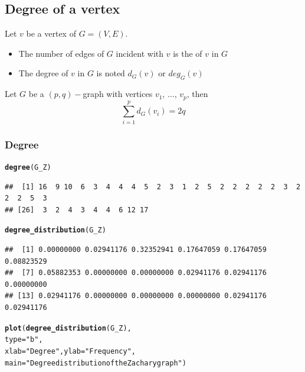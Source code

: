 \documentclass[aspectratio=169]{beamer}\usepackage[]{graphicx}\usepackage[]{xcolor}
\makeatletter
\newcommand{\hlsng}[1]{\textcolor[rgb]{0.192,0.494,0.8}{#1}}%
\newcommand{\hldef}[1]{\textcolor[rgb]{0.345,0.345,0.345}{#1}}%
\newcommand{\hlkwc}[1]{\textcolor[rgb]{0.333,0.667,0.333}{#1}}%
\newcommand{\hlkwd}[1]{\textcolor[rgb]{0.737,0.353,0.396}{\textbf{#1}}}%
\newenvironment{kframe}{%
 \def\at@end@of@kframe{}%
 \ifinner\ifhmode%
  \def\at@end@of@kframe{\end{minipage}}%
  \begin{minipage}{\columnwidth}%
 \fi\fi%
 \def\FrameCommand##1{\hskip\@totalleftmargin \hskip-\fboxsep
 \colorbox{shadecolor}{##1}\hskip-\fboxsep
     \hskip-\linewidth \hskip-\@totalleftmargin \hskip\columnwidth}%
 \MakeFramed {\advance\hsize-\width
   \@totalleftmargin\z@ \linewidth\hsize
   \@setminipage}}%
 {\par\unskip\endMakeFramed%
 \at@end@of@kframe}
\newenvironment{knitrout}{}{} %
\makeatother
\begin{document}
\subsection{Degree of a vertex}

\begin{frame}
	\begin{definition}
	Let $v$ be a vertex of $G=(V,E)$.
	\begin{itemize}
	\item The number of edges of $G$ incident with $v$ is the  of $v$ in $G$
	\item The degree of $v$ in $G$ is noted $d_G(v)$ or $deg_G(v)$
	\end{itemize}
	\end{definition}
	\vfill
	\begin{importanttheorem}\label{th:sum-degrees}
	Let $G$ be a $(p,q)-$graph with vertices $v_1$, $\dots$, $v_p$, then
	\[
		\sum_{i=1}^{p}d_G(v_i)=2q
	\]
	\end{importanttheorem}
\end{frame}

\begin{frame}[fragile]\frametitle{Degree}
\begin{knitrout}
\color{fgcolor}\begin{kframe}
\begin{alltt}
\hlkwd{degree}\hldef{(G_Z)}
\end{alltt}
\begin{verbatim}
##  [1] 16  9 10  6  3  4  4  4  5  2  3  1  2  5  2  2  2  2  2  3  2  2  2  5  3
## [26]  3  2  4  3  4  4  6 12 17
\end{verbatim}
\begin{alltt}
\hlkwd{degree_distribution}\hldef{(G_Z)}
\end{alltt}
\begin{verbatim}
##  [1] 0.00000000 0.02941176 0.32352941 0.17647059 0.17647059 0.08823529
##  [7] 0.05882353 0.00000000 0.00000000 0.02941176 0.02941176 0.00000000
## [13] 0.02941176 0.00000000 0.00000000 0.00000000 0.02941176 0.02941176
\end{verbatim}
\begin{alltt}
\hlkwd{plot}\hldef{(}\hlkwd{degree_distribution}\hldef{(G_Z),}
     \hlkwc{type} \hldef{=} \hlsng{"b"}\hldef{,}
     \hlkwc{xlab} \hldef{=} \hlsng{"Degree"}\hldef{,} \hlkwc{ylab} \hldef{=} \hlsng{"Frequency"}\hldef{,}
     \hlkwc{main} \hldef{=} \hlsng{"Degree distribution of the Zachary graph"}\hldef{)}
\end{alltt}
\end{kframe}
\end{knitrout}
\end{frame}
\end{document}
